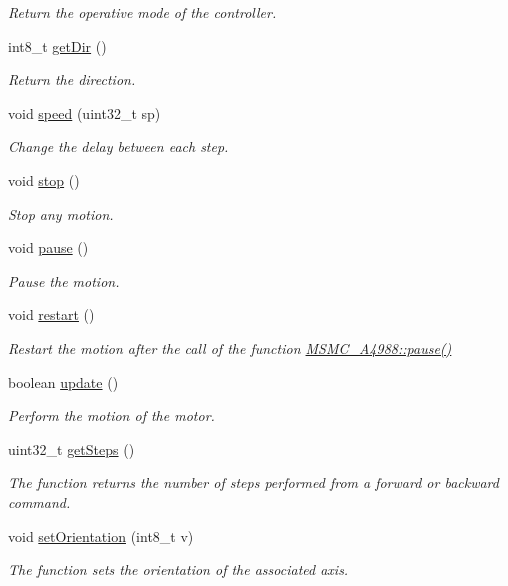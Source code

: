 \begin{DoxyCompactItemize}
\begin{DoxyCompactList}\small\item\em Return the operative mode of the controller. \end{DoxyCompactList}\item 
int8\+\_\+t \hyperlink{class_m_s_m_c___a4988_acf7598266c1ced18507d43f811c98db9}{get\+Dir} ()
\begin{DoxyCompactList}\small\item\em Return the direction. \end{DoxyCompactList}\item 
void \hyperlink{class_m_s_m_c___a4988_a6f9d236dc619342d16457aa029faeed9}{speed} (uint32\+\_\+t sp)
\begin{DoxyCompactList}\small\item\em Change the delay between each step. \end{DoxyCompactList}\item 
void \hyperlink{class_m_s_m_c___a4988_a4038481ce6b8131ea22d5e0d331ca6c7}{stop} ()
\begin{DoxyCompactList}\small\item\em Stop any motion. \end{DoxyCompactList}\item 
void \hyperlink{class_m_s_m_c___a4988_a321bc53bae537a0318910819a6a1a7d5}{pause} ()
\begin{DoxyCompactList}\small\item\em Pause the motion. \end{DoxyCompactList}\item 
void \hyperlink{class_m_s_m_c___a4988_add93aa459190c6edb3551495e75aaded}{restart} ()
\begin{DoxyCompactList}\small\item\em Restart the motion after the call of the function \hyperlink{class_m_s_m_c___a4988_a321bc53bae537a0318910819a6a1a7d5}{M\+S\+M\+C\+\_\+\+A4988\+::pause()} \end{DoxyCompactList}\item 
boolean \hyperlink{class_m_s_m_c___a4988_a409bea28b42827c8bd7d5e5e318af21d}{update} ()
\begin{DoxyCompactList}\small\item\em Perform the motion of the motor. \end{DoxyCompactList}\item 
uint32\+\_\+t \hyperlink{class_m_s_m_c___a4988_ab097e238a4a8c905e478ecff23907059}{get\+Steps} ()
\begin{DoxyCompactList}\small\item\em The function returns the number of steps performed from a forward or backward command. \end{DoxyCompactList}\item 
void \hyperlink{class_m_s_m_c___a4988_a620616f8e3cad131c8a57b48c3c8551f}{set\+Orientation} (int8\+\_\+t v)
\begin{DoxyCompactList}\small\item\em The function sets the orientation of the associated axis. \end{DoxyCompactList}\end{DoxyCompactItemize}
